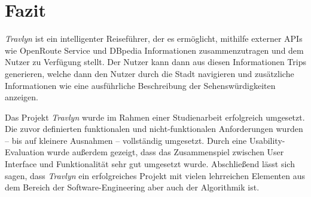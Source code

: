 \chapter{Fazit}

	\textit{Travlyn} ist ein intelligenter Reiseführer, der es ermöglicht, mithilfe externer \acs{API}s wie OpenRoute Service und DBpedia Informationen zusammenzutragen und dem Nutzer zu Verfügung stellt. Der Nutzer kann dann aus diesen Informationen Trips generieren, welche dann den Nutzer durch die Stadt navigieren und zusätzliche Informationen wie eine ausführliche Beschreibung der Sehenswürdigkeiten anzeigen. 
	
	Das Projekt \textit{Travlyn} wurde im Rahmen einer Studienarbeit erfolgreich umgesetzt. Die zuvor definierten funktionalen und nicht-funktionalen Anforderungen wurden -- bis auf kleinere Ausnahmen -- vollständig umgesetzt. Durch eine Usability-Evaluation wurde außerdem gezeigt, dass das Zusammenspiel zwischen User Interface und Funktionalität sehr gut umgesetzt wurde. Abschließend lässt sich sagen, dass \textit{Travlyn} ein erfolgreiches Projekt mit vielen lehrreichen Elementen aus dem Bereich der Software-Engineering aber auch der Algorithmik ist. 
